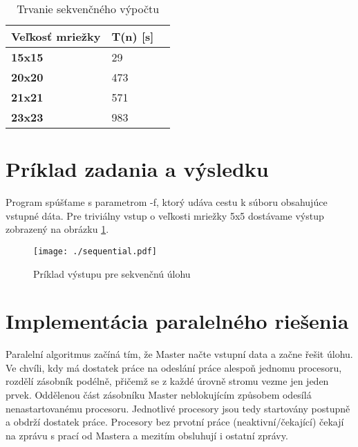 \documentclass[slovak]{article}
\begin{document}
	\begin{table}\centering
		\begin{tabularx}{\textwidth}{|X|X|X|}
			\hline                        
			\textbf{Veľkosť mriežky} & \textbf{T(n) [s]} \\ \hline
			\textbf{15x15} 	& 29 \\ \hline
			\textbf{20x20} 	& 473 \\ \hline
			\textbf{21x21} 	& 571 \\ \hline
			\textbf{23x23} 	& 983 \\ \hline
		\end{tabularx}
	\caption{Trvanie sekvenčného výpočtu}
	\label{tab:sek}
	\end{table}

\section{Príklad zadania a výsledku}

Program spúšťame s parametrom -f, ktorý udáva cestu k súboru obsahujúce vstupné dáta. Pre triviálny vstup o veľkosti mriežky 5x5 dostávame výstup zobrazený na obrázku \ref{fig:sek}.

	\begin{figure}[!h]\centering
	\texttt{[image: ./sequential.pdf]}
	\caption{Príklad výstupu pre sekvenčnú úlohu}\label{fig:sek}
	\end{figure}

\section{Implementácia paralelného riešenia}

Paralelní algoritmus začíná tím, že Master načte vstupní data a začne
řešit úlohu. Ve chvíli, kdy má dostatek práce na odeslání práce alespoň
jednomu procesoru, rozdělí zásobník podélně, přičemž se z každé úrovně
stromu vezme jen jeden prvek. Oddělenou část zásobníku Master neblokujícím
způsobem odesílá nenastartovanému procesoru. Jednotlivé procesory jsou
tedy startovány postupně a obdrží dostatek práce. Procesory bez prvotní
práce (neaktivní/čekající) čekají na zprávu s prací od Mastera a mezitím
obsluhují i ostatní zprávy.
\end{document}
